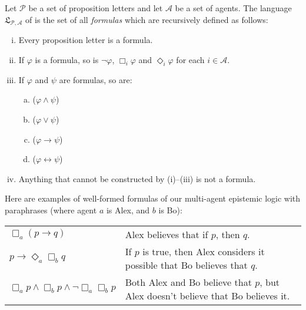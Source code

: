 \documentclass[nobib,nofonts]{tufte-handout}
\newcommand{\mygray}[1]{\textcolor{mygray2}{#1}}
\newcommand{\modlog}{\acro{ModLog}}
\begin{document}
Let $\mathcal{P}$ be a set of proposition letters and let $\mathcal{A}$ be a set of agents.
The language $\mathfrak{L}_{\mathcal{P},\mathcal{A}}$ of \modlog is the set of all \emph{formulas} which are recursively defined as follows:
\begin{enumerate}[(i)]
  \item Every proposition letter is a formula.
  \item If $\varphi$ is a formula, so is $\neg \varphi$, $\Box_{i} \varphi$ and $\Diamond_{i} \varphi$ for each $i \in \mathcal{A}$.
  \item If $\varphi$ and $\psi$ are formulas, so are:
        \vspace*{-0.4cm}
        \begin{multicols}{4}
          \begin{enumerate}[a.]
            \item ($\varphi \wedge \psi$)
            \item ($\varphi \vee \psi$)
            \item ($\varphi \rightarrow \psi$)
            \item ($\varphi \leftrightarrow \psi$)
          \end{enumerate}
        \end{multicols}
        \vspace*{-0.4cm}
  \item Anything that cannot be constructed by (i)--(iii) is not a formula.
\end{enumerate}


Here are examples of well-formed formulas of our multi-agent epistemic logic with paraphrases (where agent $a$ is Alex, and $b$ is Bo):
\begin{center}
  \begin{tabular}{lp{7cm}}
    \vspace{0.3cm}
    $\Box_{a} (p \rightarrow q)$
    & \mygray{Alex believes that if $p$, then $q$.}
    \\
    \vspace{0.3cm}
    $p \rightarrow \Diamond_{a} \Box_{b} q$
    & \mygray{If $p$ is true, then Alex considers it possible that Bo believes that $q$.}
    \\
    $\Box_{a} p \wedge \Box_{b} p \wedge \neg \Box_{a} \Box_{b} p$
    & \mygray{Both Alex and Bo believe that $p$, but Alex doesn't believe that Bo believes it.}

  \end{tabular}
\end{center}
\end{document}
